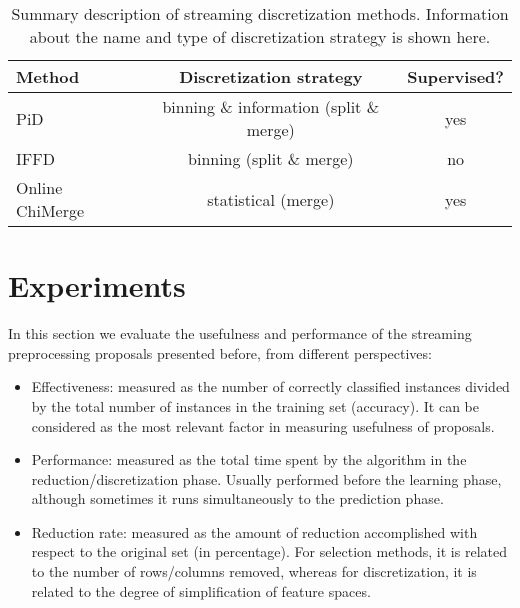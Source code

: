 \documentclass[preprint,12pt]{elsarticle}
\begin{document}
\begin{table}[!htp]
\renewcommand{\arraystretch}{1.3}
\centering
\scriptsize
\caption{Summary description of streaming discretization methods. Information about the name and type of discretization strategy is shown here.}
\label{tab:disc}
\begin{tabular}{lcc}
\toprule
{\bf Method} & {\bf Discretization strategy} & {\bf Supervised?}\\
\midrule
PiD~\cite{gama06} & binning \& information (split \& merge) & yes\\
IFFD~\cite{lu06} & binning (split \& merge) & no \\
Online ChiMerge~\cite{lehti12} &  statistical (merge) & yes\\
\bottomrule
\end{tabular}
\end{table}


\section{Experiments}
\label{sec:exp}

In this section we evaluate the usefulness and performance of the streaming preprocessing proposals presented before, from different perspectives:

\begin{itemize}
	\item Effectiveness: measured as the number of correctly classified instances divided by the total number of instances in the training set (accuracy). It can be considered as the most relevant factor in measuring usefulness of proposals.
	\item Performance: measured as the total time spent by the algorithm in the reduction/discretization phase. Usually performed before the learning phase, although sometimes it runs simultaneously to the prediction phase.
	\item Reduction rate: measured as the amount of reduction accomplished with respect to the original set (in percentage). For selection methods, it is related to the number of rows/columns removed, whereas for discretization, it is related to the degree of simplification of feature spaces.
\end{itemize} 
\end{document}
